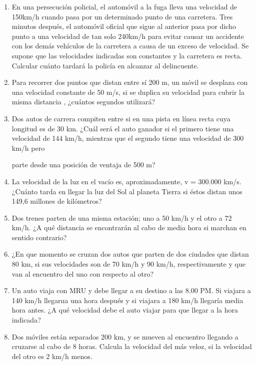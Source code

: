 \begin{enumerate}
\item En una persecución policial, el automóvil a la fuga lleva una velocidad de 150km/h cuando
 pasa por un determinado punto 
de una carretera. Tres minutos después, el automóvil oficial que sigue al
 anterior pasa por dicho punto a una velocidad de tan 
solo 240km/h para evitar causar un accidente con los
 demás vehículos de la carretera a causa de un exceso de velocidad. Se 
supone que las velocidades indicadas
 son constantes y la carretera es recta. Calcular cuánto tardará la policía en alcanzar 
al delincuente.


\item Para recorrer dos puntos que distan entre sí 200 m, un
 móvil se desplaza con una velocidad constante de 50 m/s, si se 
duplica su velocidad para
 cubrir la misma distancia , ¿cuántos segundos utilizará?

\item  Dos autos de carrera compiten entre si
 en una pista en
 línea recta cuya longitud es de 30 km. ¿Cuál será el auto 
ganador si el primero tiene una
 velocidad de 144 km/h, mientras que el segundo tiene una velocidad de 300 km/h pero

parte desde una posición de ventaja de 500 m?

\item  La velocidad de la luz en el vacío es, 
aproximadamente, v = 300.000 km/s. ¿Cuánto tarda en llegar la luz del Sol al 
planeta Tierra si éstos 
distan unos 149,6 millones de kilómetros?


\item  Dos trenes parten de una misma
 estación; uno a 50 km/h y el otro a 72 km/h. ¿A qué distancia se encontrarán al cabo de 
media
 hora si marchan en sentido contrario? 


\item  ¿En que momento se cruzan dos 
 autos que parten de dos ciudades que distan 80 km, si sus velocidades son de 70 km/h y 90 
km/h, 
respectivamente y que van al encuentro del uno con respecto al otro?

\item  Un auto viaja con MRU y debe llegar a su destino a las
 8.00 PM. Si viajara a 140 km/h llegarııa una hora después y si 
viajara a 180 km/h llegaría
 media hora antes. ¿A qué velocidad debe el auto viajar para que llegar a la hora indicada?

\item Dos
 móviles están separados 200 km, y se mueven al encuentro llegando a cruzarse al cabo
 de 8 horas. Calcula la velocidad 
del más veloz, si la velocidad del otro es 2 km/h menos. 
\end{enumerate}

